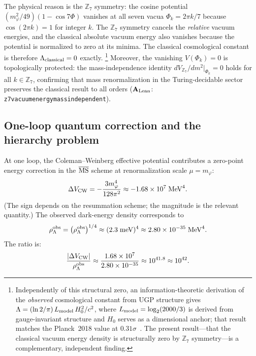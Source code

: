\documentclass[11pt]{article}
\theoremstyle{remark}
\newcommand{\ZS}{\mathbb{Z}_7}
\newcommand{\lean}[1]{%
  \penalty-100
  \begingroup\def\_{\textunderscore\allowbreak}\texttt{#1}\endgroup}
\newcommand{\CatAL}{\ensuremath{\textbf{A}_{\rm Lean}}}
\newcommand{\rhoLam}{\rho_\Lambda}
\begin{document}
The physical reason is the $\ZS$ symmetry: the cosine potential
$(m_\varphi^2/49)(1-\cos 7\Phi)$ vanishes at all seven vacua $\Phi_k = 2\pi k/7$
because $\cos(2\pi k) = 1$ for integer $k$.
The $\ZS$ symmetry cancels the \emph{relative} vacuum energies, and the classical
absolute vacuum energy also vanishes because the potential is normalized to zero
at its minima.
The classical cosmological constant is therefore $\Lambda_{\rm classical} = 0$ exactly.%
\footnote{Independently of this structural zero, an information-theoretic derivation
of the \emph{observed} cosmological constant from UGP structure gives
$\Lambda = (\ln 2/\pi)\,L_{\rm model}\,H_0^2/c^2$,
where $L_{\rm model} = \log_2(2000/3)$ is derived from gauge-invariant structure and $H_0$
serves as a dimensional anchor; that result matches the Planck~2018 value at $0.31\sigma$~\cite{SpivackSM}.
The present result---that the classical vacuum energy density is structurally zero by $\ZS$
symmetry---is a complementary, independent finding.}
Moreover, the vanishing $V(\Phi_k)=0$ is topologically protected: the mass-independence identity $dV_{\ZS}/dm^2|_{\Phi_k}=0$ holds for all $k\in\ZS$, confirming that mass renormalization in the Turing-decidable sector preserves the classical result to all orders ($\CatAL$: \lean{z7\_vacuum\_energy\_mass\_independent}).

\subsection{One-loop quantum correction and the hierarchy problem}

At one loop, the Coleman--Weinberg effective potential contributes a
zero-point energy correction in the $\overline{\rm MS}$ scheme at
renormalization scale $\mu = m_\varphi$:
\begin{equation}
  \Delta V_{\rm CW} = -\frac{3m_\varphi^4}{128\pi^2}
  \approx -1.68\times10^{7}\;\text{MeV}^4.
\label{eq:delta_V_CW}
\end{equation}
(The sign depends on the resummation scheme; the magnitude is the relevant quantity.)
The observed dark-energy density corresponds to
\begin{equation}
  \rhoLam^{\rm obs} = \bigl(\rho_\Lambda^{\rm obs}\bigr)^{1/4}
  \approx (2.3\;\text{meV})^4
  \approx 2.80\times10^{-35}\;\text{MeV}^4.
\label{eq:rho_obs}
\end{equation}
The ratio is:
\begin{equation}
  \frac{|\Delta V_{\rm CW}|}{\rhoLam^{\rm obs}}
  \approx \frac{1.68\times10^{7}}{2.80\times10^{-35}}
  \approx 10^{41.8} \approx 10^{42}.
\label{eq:hierarchy}
\end{equation}
\end{document}
